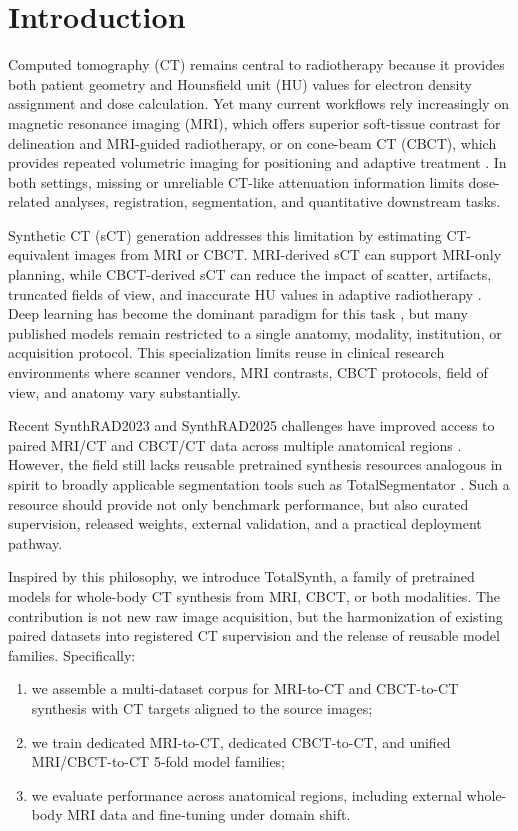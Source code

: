\documentclass{article}
\begin{document}
\section{Introduction}

Computed tomography (CT) remains central to radiotherapy because it provides both patient geometry and Hounsfield unit (HU) values for electron density assignment and dose calculation. Yet many current workflows rely increasingly on magnetic resonance imaging (MRI), which offers superior soft-tissue contrast for delineation and MRI-guided radiotherapy, or on cone-beam CT (CBCT), which provides repeated volumetric imaging for positioning and adaptive treatment \cite{bahloul2024advancements,boulanger2021deep}. In both settings, missing or unreliable CT-like attenuation information limits dose-related analyses, registration, segmentation, and quantitative downstream tasks.

Synthetic CT (sCT) generation addresses this limitation by estimating CT-equivalent images from MRI or CBCT. MRI-derived sCT can support MRI-only planning, while CBCT-derived sCT can reduce the impact of scatter, artifacts, truncated fields of view, and inaccurate HU values in adaptive radiotherapy \cite{liu2023review}. Deep learning has become the dominant paradigm for this task \cite{edmund2017review,spadea2021deep}, but many published models remain restricted to a single anatomy, modality, institution, or acquisition protocol. This specialization limits reuse in clinical research environments where scanner vendors, MRI contrasts, CBCT protocols, field of view, and anatomy vary substantially.

Recent SynthRAD2023 and SynthRAD2025 challenges have improved access to paired MRI/CT and CBCT/CT data across multiple anatomical regions \cite{huijben2024generating,thummerer2025synthrad2025}. However, the field still lacks reusable pretrained synthesis resources analogous in spirit to broadly applicable segmentation tools such as TotalSegmentator \cite{wasserthal2023totalsegmentator}. Such a resource should provide not only benchmark performance, but also curated supervision, released weights, external validation, and a practical deployment pathway.

Inspired by this philosophy, we introduce TotalSynth, a family of pretrained models for whole-body CT synthesis from MRI, CBCT, or both modalities. The contribution is not new raw image acquisition, but the harmonization of existing paired datasets into registered CT supervision and the release of reusable model families. Specifically:
\begin{enumerate}
    \item we assemble a multi-dataset corpus for MRI-to-CT and CBCT-to-CT synthesis with CT targets aligned to the source images;
    \item we train dedicated MRI-to-CT, dedicated CBCT-to-CT, and unified MRI/CBCT-to-CT 5-fold model families;
    \item we evaluate performance across anatomical regions, including external whole-body MRI data and fine-tuning under domain shift.
\end{enumerate}
\end{document}
